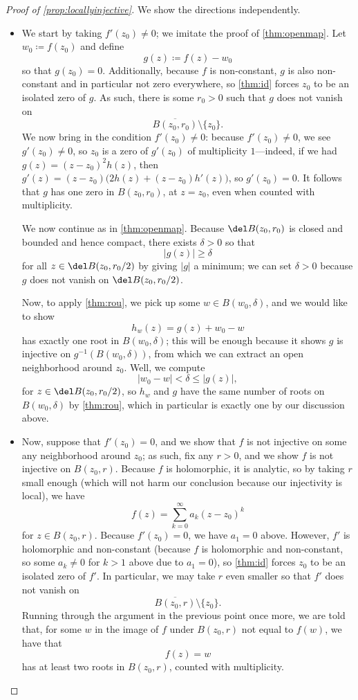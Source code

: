 \documentclass[../notes.tex]{subfiles}
\begin{document}
\begin{proof}[Proof of \autoref{prop:locallyinjective}]
	We show the directions independently.
	\begin{itemize}
		\item We start by taking $f'(z_0)\ne0$; we imitate the proof of \autoref{thm:openmap}. Let $w_0\coloneqq f(z_0)$ and define
		\[g(z)\coloneqq f(z)-w_0\]
		so that $g(z_0)=0$. Additionally, because $f$ is non-constant, $g$ is also non-constant and in particular not zero everywhere, so \autoref{thm:id} forces $z_0$ to be an isolated zero of $g$. As such, there is some $r_0>0$ such that $g$ does not vanish on
		\[\overline{B(z_0,r_0)}\setminus\{z_0\}.\]
		We now bring in the condition $f'(z_0)\ne0$: because $f'(z_0)\ne0$, we see $g'(z_0)\ne0$, so $z_0$ is a zero of $g'(z_0)$ of multiplicity $1$---indeed, if we had $g(z)=(z-z_0)^2h(z)$, then $g'(z)=(z-z_0)\big(2h(z)+(z-z_0)h'(z)\big)$, so $g'(z_0)=0$. It follows that $g$ has one zero in $B(z_0,r_0)$, at $z=z_0$, even when counted with multiplicity.
	
		We now continue as in \autoref{thm:openmap}. Because $\del B(z_0,r_0)$ is closed and bounded and hence compact, there exists $\delta>0$ so that
		\[|g(z)|\ge\delta\]
		for all $z\in\del B(z_0,r_0/2)$ by giving $|g|$ a minimum; we can set $\delta>0$ because $g$ does not vanish on $\del B(z_0,r_0/2)$.
	
		Now, to apply \autoref{thm:rou}, we pick up some $w\in B(w_0,\delta)$, and we would like to show 
		\[h_w(z)=g(z)+w_0-w\]
		has exactly one root in $B(w_0,\delta)$; this will be enough because it shows $g$ is injective on $g^{-1}(B(w_0,\delta))$, from which we can extract an open neighborhood around $z_0$. Well, we compute
		\[|w_0-w|<\delta\le|g(z)|,\]
		for $z\in\del B(z_0,r_0/2)$, so $h_w$ and $g$ have the same number of roots on $B(w_0,\delta)$ by \autoref{thm:rou}, which in particular is exactly one by our discussion above.
	
		\item Now, suppose that $f'(z_0)=0$, and we show that $f$ is not injective on some any neighborhood around $z_0$; as such, fix any $r>0$, and we show $f$ is not injective on $B(z_0,r)$. Because $f$ is holomorphic, it is analytic, so by taking $r$ small enough (which will not harm our conclusion because our injectivity is local), we have
		\[f(z)=\sum_{k=0}^\infty a_k(z-z_0)^k\]
		for $z\in B(z_0,r)$. Because $f'(z_0)=0$, we have $a_1=0$ above. However, $f'$ is holomorphic and non-constant (because $f$ is holomorphic and non-constant, so some $a_k\ne0$ for $k>1$ above due to $a_1=0$), so \autoref{thm:id} forces $z_0$ to be an isolated zero of $f'$. In particular, we may take $r$ even smaller so that $f'$ does not vanish on
		\[\overline{B(z_0,r)}\setminus\{z_0\}.\]
		Running through the argument in the previous point once more, we are told that, for some $w$ in the image of $f$ under $B(z_0,r)$ not equal to $f(w)$, we have that
		\[f(z)=w\]
		has at least two roots in $B(z_0,r)$, counted with multiplicity.


\end{itemize}
\end{proof}
\end{document}
